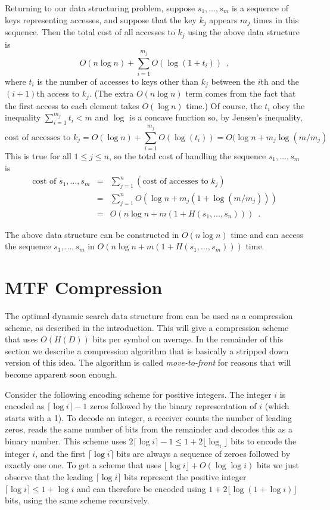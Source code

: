 Returning to our data structuring problem, suppose $s_1,\ldots,s_m$ is
a sequence of keys representing accesses, and suppose that the key
$k_j$ appears $m_j$ times in this sequence.  Then the total cost of all
accesses to $k_j$ using the above data structure is 
\[
  O(n\log n) + \sum_{i=1}^{m_j} O(\log(1+t_i)) \enspace ,
\]
where $t_i$ is the number of accesses to keys other than $k_j$ between
the $i$th and the $(i+1)$th access to $k_j$.  (The extra $O(n\log n)$
term comes from the fact that the first access to each element takes
$O(\log n)$ time.)  Of course, the $t_i$ obey the inequality
$\sum_{i=1}^{m_j} t_i < m$ and $\log$ is a concave function so, by
Jensen's inequality,
\[
  \mbox{cost of accesses to $k_j$} = O(\log n) + \sum_{i=1}^{m_{j}} O(\log(t_i))
	 = O(\log n + m_j\log(m/m_j)
\]
This is true for all $1\le j\le n$, so the total cost of handling the
sequence $s_1,\ldots,s_m$ is
\begin{eqnarray*}
\mbox{cost of $s_1,\ldots,s_m$} 
  & = & \sum_{j=1}^n(\mbox{cost of accesses to $k_j$}) \\
  & = & \sum_{j=1}^n O(\log n + m_j(1+\log(m/m_j))) \\
  & = & O(n\log n + m(1+H(s_1,\ldots,s_n))) \enspace .
\end{eqnarray*}

\begin{thm}
The above data structure can be constructed in $O(n\log n)$ time
and can access the sequence $s_1,\ldots,s_m$ in $O(n\log n +
m(1+H(s_1,\ldots,s_m)))$ time.
\end{thm}


\section{MTF Compression}

The optimal dynamic search data structure from  can be
used as a compression scheme, as described in the introduction.  This
will give a compression scheme that uses $O(H(D))$ bits per symbol on
average.  In the remainder of this section we describe a compression
algorithm that is basically a stripped down version of this idea.  The
algorithm is called \emph{move-to-front} for reasons that will become
apparent soon enough.  

Consider the following encoding scheme for positive integers.  The
integer $i$ is encoded as $\lceil\log i\rceil-1$ zeros followed by the
binary representation of $i$ (which starts with a 1).  To decode an
integer, a receiver counts the number of leading zeros, reads the same
number of bits from the remainder and decodes this as a binary number.
This scheme uses $2\lceil\log i\rceil-1\le 1+2\lfloor\log_i\rfloor$
bits to encode the integer $i$, and the first $\lceil\log i\rceil$
bits are always a sequence of zeroes followed by exactly one one.  To
get a scheme that uses $\lfloor\log i\rfloor+O(\log\log i)$ bits we
just observe that the leading $\lceil\log i\rceil$ bits represent the
positive integer $\lceil\log i\rceil\le 1+\log i$ and can therefore be
encoded using $1+2\lfloor\log(1+\log i)\rfloor$ bits, using the same
scheme recursively.

